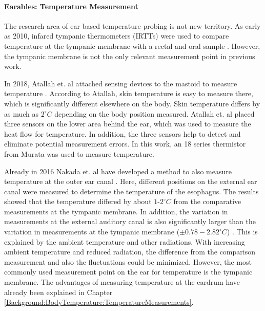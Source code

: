 \paragraph{Earables: Temperature Measurement}
The research area of ear based temperature probing is not new territory.
As early as 2010, infared tympanic thermometers (IRTTs) were used to compare temperature at the tympanic membrane with a rectal and oral sample \cite{bagleyValidityFieldExpedient2011, basakComparisonThreeDifferent2013, bhanguDetectionManagementHypothermia2010, fogtNoninvasiveMeasuresCore2017, ComparisonTwoMethods, kallmunzerLocalHeadNeck2011, muthInfraredEarThermometry2010, moran-navarroValiditySkinOral2019, leeValidityInfraredTympanic2011, keeneAccuracyTympanicTemperature2015}.
However, the tympanic membrane is not the only relevant measurement point in previous work. 

In 2018, Atallah et. al attached sensing devices to the mastoid to measure temperature \cite{atallahErgonomicWearableCore2018}. 
According to Atallah, skin temperature is easy to measure there, which is significantly different elsewhere on the body. 
Skin temperature differs by as much as $2 ^\circ C$ depending on the body position measured.
Atallah et. al placed three sensors on the lower area behind the ear, which was used to measure the heat flow for temperature.
In addition, the three sensors help to detect and eliminate potential measurement errors.
In this work, an 18 series thermistor from Murata was used to measure temperature.

Already in 2016 Nakada et. al have developed a method to also measure temperature at the outer ear canal \cite{nakadaDevelopmentMethodEstimating2017a}.
Here, different positions on the external ear canal were measured to determine the temperature of the esophagus. 
The results showed that the temperature differed by about $1\text{-}2 ^\circ C$ from the comparative measurements at the tympanic membrane.
In addition, the variation in measurements at the external auditory canal is also significantly larger than the variation in measurements at the tympanic membrane ($\pm 0.78-2.82 ^\circ C$) \cite{nakadaDevelopmentMethodEstimating2017a}.
This is explained by the ambient temperature and other radiations.
With increasing ambient temperature and reduced radiation, the difference from the comparison measurement and also the fluctuations could be minimized.
However, the most commonly used measurement point on the ear for temperature is the tympanic membrane. 
The advantages of measuring temperature at the eardrum have already been explained in Chapter \ref{Background:BodyTemperature:TemperatureMeasurements}.

